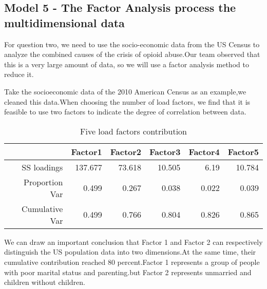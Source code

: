 \documentclass{mcmthesis}
\begin{document}
\newpage
\subsection{Model 5 - The Factor Analysis process the multidimensional data}%

For question two, we need to use the socio-economic data from the US Census to analyze the combined causes of the crisis of opioid abuse.Our team observed that this is a very large amount of data, so we will use a factor analysis method to reduce it.

Take the socioeconomic data of the 2010 American Census as an example,we cleaned this data.When choosing the number of load factors, we find that it is feasible to use two factors to indicate the degree of correlation between data.

\begin{table}[htbp]
	\centering
	\caption{Five load factors contribution}
	\begin{tabular}{rrrrrr}
		\addlinespace
		\toprule
		& Factor1 & Factor2 & Factor3 & Factor4 & Factor5 \\
		\midrule
		SS loadings  & 137.677 & 73.618 & 10.505 & 6.19  & 10.784 \\
		Proportion Var  & 0.499 & 0.267 & 0.038 & 0.022 & 0.039 \\
		Cumulative Var  & 0.499 & 0.766 & 0.804 & 0.826 & 0.865 \\
		\bottomrule
	\end{tabular}%
	\label{tab:factor}%
\end{table}%

We can draw an important conclusion that Factor 1 and Factor 2 can respectively distinguish the US population data into two dimensions.At the same time, their cumulative contribution reached 80 percent.Factor 1 represents a group of people with poor marital status and parenting.but Factor 2 represents unmarried and children without children. 
\end{document}
